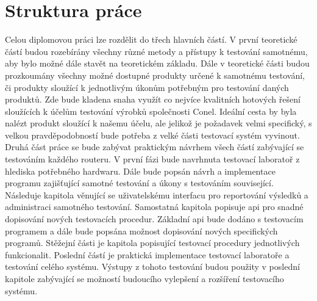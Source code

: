 \section{Struktura práce}
Celou diplomovou práci lze rozdělit do třech hlavních částí. V první teoretické částí budou rozebírány všechny různé metody a přístupy k testování samotnému, aby bylo možné dále stavět na teoretickém základu. Dále v teoretické části budou prozkoumány všechny možné dostupné produkty určené k samotnému testování, či produkty sloužící k jednotlivým úkonům potřebným pro testování daných produktů. Zde bude kladena snaha využít co nejvíce kvalitních hotových řešení sloužících k účelům testování výrobků společnosti Conel. Ideální cesta by byla nalézt produkt sloužící k našemu účelu, ale jelikož je požadavek velmi specifický, s velkou pravděpodobností bude potřeba z velké části testovací systém vyvinout. Druhá část práce se bude zabývat praktickým návrhem všech částí zabývající se testováním každého routeru. V první fázi bude navrhnuta testovací laboratoř z hlediska potřebného hardwaru. Dále bude popsán návrh a implementace programu zajišťující samotné testování a úkony s testováním související. Následuje kapitola věnující se uživatelskému interfacu pro reportování výsledků a administraci samotného testování. Samostatná kapitola popisuje api pro snadné dopisování nových testovacích procedur. Základní api bude dodáno s testovacím programem a dále bude popsána možnost dopisování nových specifických programů. Stěžejní části je kapitola popisující testovací procedury jednotlivých funkcionalit. Poslední částí je praktická implementace testovací laboratoře a testování celého systému. Výstupy z tohoto testování budou použity v poslední kapitole zabývající se možností budoucího vylepšení a rozšíření testovacího systému.

\endinput
